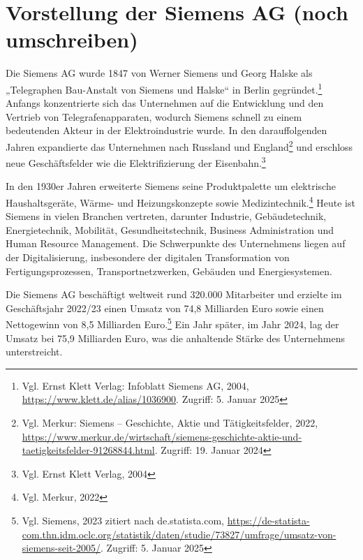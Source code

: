 \chapter{Vorstellung der Siemens AG (noch umschreiben)}\label{ch:data}

Die Siemens AG wurde 1847 von Werner Siemens und Georg Halske als „Telegraphen Bau-Anstalt von Siemens und Halske“ in Berlin 
gegründet.\footnote{Vgl. Ernst Klett Verlag: Infoblatt Siemens AG, 2004, \url{https://www.klett.de/alias/1036900}. Zugriff: 5. Januar 2025} 
Anfangs konzentrierte sich das Unternehmen auf die Entwicklung und den Vertrieb von Telegrafenapparaten, wodurch Siemens schnell zu einem 
bedeutenden Akteur in der Elektroindustrie wurde. In den darauffolgenden Jahren expandierte das Unternehmen nach Russland und 
England\footnote{Vgl. Merkur: Siemens – Geschichte, Aktie und Tätigkeitsfelder, 2022, \url{https://www.merkur.de/wirtschaft/siemens-geschichte-aktie-und-taetigkeitsfelder-91268844.html}. Zugriff: 19. Januar 2024} 
und erschloss neue Geschäftsfelder wie die Elektrifizierung der Eisenbahn.\footnote{Vgl. Ernst Klett Verlag, 2004}

In den 1930er Jahren erweiterte Siemens seine Produktpalette um elektrische Haushaltsgeräte, Wärme- und Heizungskonzepte sowie 
Medizintechnik.\footnote{Vgl. Merkur, 2022} Heute ist Siemens in vielen Branchen vertreten, darunter Industrie, Gebäudetechnik, Energietechnik, 
Mobilität, Gesundheitstechnik, Business Administration und Human Resource Management. Die Schwerpunkte des Unternehmens liegen auf der 
Digitalisierung, insbesondere der digitalen Transformation von Fertigungsprozessen, Transportnetzwerken, Gebäuden und Energiesystemen.

Die Siemens AG beschäftigt weltweit rund 320.000 Mitarbeiter und erzielte im Geschäftsjahr 2022/23 einen Umsatz von 74,8 Milliarden Euro sowie 
einen Nettogewinn von 8,5 Milliarden Euro.\footnote{Vgl. Siemens, 2023 zitiert nach de.statista.com, 
\url{https://de-statista-com.thn.idm.oclc.org/statistik/daten/studie/73827/umfrage/umsatz-von-siemens-seit-2005/}. Zugriff: 5. Januar 2025} 
Ein Jahr später, im Jahr 2024, lag der Umsatz bei 75,9 Milliarden Euro, was die anhaltende Stärke des Unternehmens unterstreicht.
